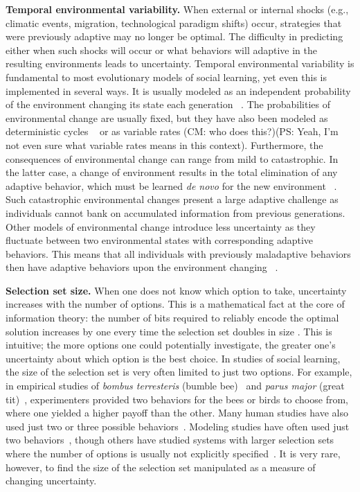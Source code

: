 \documentclass[letterpaper,11.5pt]{scrartcl}
\newcommand{\cm}[1]{{\textcolor{mypurple} {({\tiny CM:} #1)}}}
\newcommand{\ps}[1]{{\textcolor{mygreen} {({\tiny PS:} #1)}}}
\begin{document}
\textbf{Temporal environmental variability.}
When external or internal shocks (e.g., climatic events, migration, technological paradigm shifts) occur, strategies that were previously adaptive may no longer be optimal. The difficulty in predicting either when such shocks will occur or what behaviors will adaptive in the resulting environments leads to uncertainty. 
Temporal environmental variability is fundamental to most evolutionary models of social learning, yet even this is implemented in several ways. It is usually modeled as an independent probability of the environment changing its state each generation ~\cite{BoydRicherson1985,Rogers1988,Feldman1996,McElreath2005,Enquist2007,perreault2012bayesian,aoki2014evolution}. The probabilities of environmental change are usually fixed, %
but they have also been modeled as deterministic cycles ~\cite{Feldman1996, aoki2014evolution} or as variable rates \cm{who does this?}\ps{Yeah, I'm not even sure what variable rates means in this context}. Furthermore, the consequences of environmental change can range from mild to  catastrophic. In the latter case, a change of environment results in the total elimination of any adaptive behavior, which must be learned \emph{de novo} for the new environment ~\cite{Rogers1988}. Such catastrophic environmental changes present a large adaptive challenge as individuals cannot bank on accumulated information from previous generations. Other models of environmental change introduce less uncertainty as they fluctuate between two environmental states with corresponding adaptive behaviors. This means that all individuals with previously maladaptive behaviors then have adaptive behaviors upon the environment changing ~\cite{perreault2012bayesian}. 

\textbf{Selection set size.}
When one does not know which option to take, uncertainty increases with the number of options. This is a mathematical fact at the core of information theory: the number of bits required to reliably encode the optimal solution increases by one every time the selection set doubles in size  \cite{mackay2003information}. 
This is intuitive; the more options one could potentially investigate, the greater one's uncertainty about which option is the best choice. In studies of social learning, the size of the selection set is very often limited to just two options. 
For example, in empirical studies of \emph{bombus terresteris} (bumble
bee)~\cite{Baracchi2018} and \emph{parus major} (great tit)~\cite{Aplin2017},
experimenters provided two behaviors for
the bees or birds to choose from, where one yielded a higher payoff than the other. %
Many human studies have also used just two
or three possible behaviors~\cite{McElreath2005,Toyokawa2019}.
Modeling studies have often used just two 
behaviors~\cite{Rogers1988,Feldman1996,Rendell2010,perreault2012bayesian}, though others have studied systems with larger selection sets where the number of options is usually not explicitly specified~\cite{boyd1995does,Enquist2007}. It is very rare, however, to find the size of the selection set manipulated as a measure of changing uncertainty. 
\end{document}
